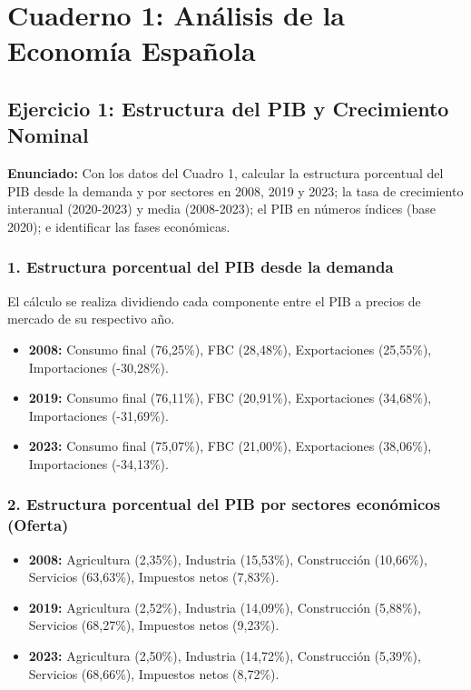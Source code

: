 
\section{Cuaderno 1: Análisis de la Economía Española}

\subsection{Ejercicio 1: Estructura del PIB y Crecimiento Nominal}

\textbf{Enunciado:} Con los datos del Cuadro 1, calcular la estructura porcentual del PIB desde la demanda y por sectores en 2008, 2019 y 2023; la tasa de crecimiento interanual (2020-2023) y media (2008-2023); el PIB en números índices (base 2020); e identificar las fases económicas.

\subsubsection{1. Estructura porcentual del PIB desde la demanda}
El cálculo se realiza dividiendo cada componente entre el PIB a precios de mercado de su respectivo año.

\begin{itemize}
    \item \textbf{2008:} Consumo final (76,25\%), FBC (28,48\%), Exportaciones (25,55\%), Importaciones (-30,28\%).
    \item \textbf{2019:} Consumo final (76,11\%), FBC (20,91\%), Exportaciones (34,68\%), Importaciones (-31,69\%).
    \item \textbf{2023:} Consumo final (75,07\%), FBC (21,00\%), Exportaciones (38,06\%), Importaciones (-34,13\%).
\end{itemize}

\subsubsection{2. Estructura porcentual del PIB por sectores económicos (Oferta)}
\begin{itemize}
    \item \textbf{2008:} Agricultura (2,35\%), Industria (15,53\%), Construcción (10,66\%), Servicios (63,63\%), Impuestos netos (7,83\%).
    \item \textbf{2019:} Agricultura (2,52\%), Industria (14,09\%), Construcción (5,88\%), Servicios (68,27\%), Impuestos netos (9,23\%).
    \item \textbf{2023:} Agricultura (2,50\%), Industria (14,72\%), Construcción (5,39\%), Servicios (68,66\%), Impuestos netos (8,72\%).
\end{itemize}

